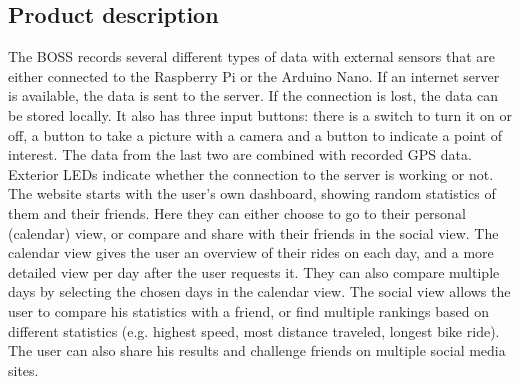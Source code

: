 \subsection{Product description}
The BOSS records several different types of data with external sensors that are either connected to the Raspberry Pi or the Arduino Nano. 
If an internet server is available, the data is sent to the server. If the connection is lost, the data can be stored locally.
It also has three input buttons: there is a switch to turn it on or off, a button to take a picture with a camera and a button to indicate a point of interest. 
The data from the last two are combined with recorded GPS data. Exterior LEDs indicate whether the connection to the server is working or not.
The website starts with the user’s own dashboard, showing random statistics of them and their friends. 
Here they can either choose to go to their personal (calendar) view, or compare and share with their friends in the social view. 
The calendar view gives the user an overview of their rides on each day, and a more detailed view per day after the user requests it. 
They can also compare multiple days by selecting the chosen days in the calendar view. 
The social view allows the user to compare his statistics with a friend, or find multiple rankings based on different statistics (e.g. highest speed, most distance traveled, longest bike ride).
The user can also share his results and challenge friends on multiple social media sites.